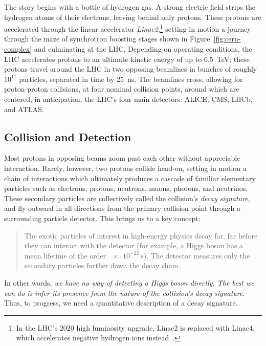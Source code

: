 \documentclass[11pt, a4paper]{article}
\begin{document}
The story begins with a bottle of hydrogen gas.
A strong electric field strips the hydrogen atoms of their electrons, leaving behind only protons.
These protons are accelerated through the linear accelerator \textit{Linac2},\footnote{In the LHC's 2020 high luminosity upgrade, Linac2 is replaced with Linac4, which accelerates negative hydrogen ions instead~\cite{linac4-tdr}.} setting in motion a journey through the maze of synchrotron boosting stages shown in Figure~\ref{fig:cern-complex} and culminating at the LHC.
Depending on operating conditions, the LHC accelerates protons to an ultimate kinetic energy of up to \SI{6.5}{\tera \electronvolt}; these protons travel around the LHC in two opposing beamlines in bunches of roughly $ 10^{11} $ particles, separated in time by \SI{25}{\nano \second}.
The beamlines cross, allowing for proton-proton collisions, at four nominal collision points, around which are centered, in anticipation, the LHC's four main detectors: ALICE, CMS, LHCb, and ATLAS.

\subsection{Collision and Detection}
Most protons in opposing beams zoom past each other without appreciable interaction.
Rarely, however, two protons collide head-on, setting in motion a chain of interactions which ultimately produces a cascade of familiar elementary particles such as electrons, protons, neutrons, muons, photons, and neutrinos.
These secondary particles are collectively called the collision's \textit{decay signature}, and fly outward in all directions from the primary collision point through a surrounding particle detector.
This brings us to a key concept:
\begin{quote}
    The exotic particles of interest in high-energy physics decay far, far before they can interact with the detector (for example, a Higgs boson has a mean lifetime of the order $ \SI[print-unity-mantissa = false]{e-22}{\second} $).
    The detector measures only the secondary particles further down the decay chain.
\end{quote}
In other words, \textit{we have no way of detecting a Higgs boson directly.
The best we can do is infer its presence from the nature of the collision's decay signature}.
Thus, to progress, we need a quantitative description of a decay signature.
\end{document}
